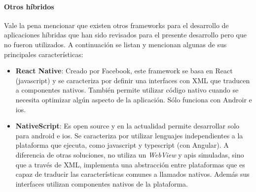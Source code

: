 
\paragraph{Otros  híbridos}
\label{otros_frameworks_hibridos}

Vale la pena mencionar que existen otros \glspl{framework} para el desarrollo de aplicaciones híbridas que han sido revisados para el presente desarrollo pero que no fueron utilizados. A continuación se listan y mencionan algunas de sus principales características:
\begin{itemize}
\item \textbf{React Native}: Creado por Facebook, este \gls{framework} se basa en React (\gls{javascript}) y se caracteriza por definir una interfaces con \gls{XML} que traducen a componentes nativos. También permite utilizar código nativo cuando se necesita optimizar algún aspecto de la aplicación. Sólo funciona con Androir e \gls{ios}.
\item \textbf{NativeScript}: Es \gls{open source} y en la actualidad permite desarrollar solo para \gls{android} e \gls{ios}. Se caracteriza por utilizar lenguajes independientes a la plataforma que ejecuta, como \gls{javascript} y \gls{typescript} (con Angular). A diferencia de otras soluciones, no utiliza un \textit{WebView} y \glspl{api} simuladas, sino que a través de \gls{XML}, implementa una abstracción entre plataformas que es capaz de traducir las características comunes a llamados nativos\cite{nativescript2017basics}. Además sus interfaces utilizan componentes nativos de la plataforma.
\end{itemize}